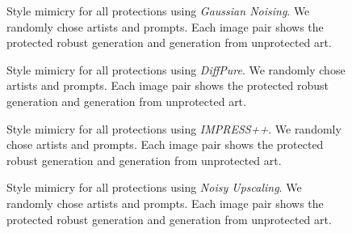 \documentclass{article}
\begin{document}
\begin{figure}[h]
    \centering
    \hspace*{-3.4cm}
    \caption{Style mimicry for all protections using \emph{Gaussian Noising}. We randomly chose artists and prompts. Each image pair shows the protected robust generation and generation from unprotected art.} 
    \label{fig:gaussiannoisingsamples}
\end{figure}


\begin{figure}[h]
    \centering
    \hspace*{-3.4cm}
    \caption{Style mimicry for all protections using \emph{DiffPure}. We randomly chose artists and prompts. Each image pair shows the protected robust generation and generation from unprotected art.} 
    \label{fig:diffpuresamples}
\end{figure}

\begin{figure}[h]
    \centering
    \hspace*{-3.4cm}
    \caption{Style mimicry for all protections using \emph{IMPRESS++}. We randomly chose artists and prompts. Each image pair shows the protected robust generation and generation from unprotected art.} 
    \label{fig:nrndsamples}
\end{figure}

\begin{figure}[h]
    \centering
    \hspace*{-3.4cm}
    \caption{Style mimicry for all protections using \emph{Noisy Upscaling}. We randomly chose artists and prompts. Each image pair shows the protected robust generation and generation from unprotected art.} 
    \label{fig:noisyupsamplingsamples}
\end{figure}
\end{document}
